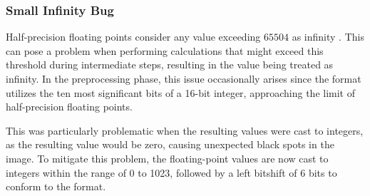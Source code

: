 \subsubsection{Small Infinity Bug}
Half-precision floating points consider any value exceeding $65504$ as infinity \cite{HalfprecisionFloatingpointFormat2023}.
This can pose a problem when performing calculations that might exceed this threshold during intermediate steps, resulting in the value being treated as infinity.
In the preprocessing phase, this issue occasionally arises since the  format utilizes the ten most significant bits of a 16-bit integer, approaching the limit of half-precision floating points.

This was particularly problematic when the resulting values were cast to integers, as the resulting value would be zero, causing unexpected black spots in the image.
To mitigate this problem, the floating-point values are now cast to integers within the range of 0 to 1023, followed by a left bitshift of 6 bits to conform to the  format.


